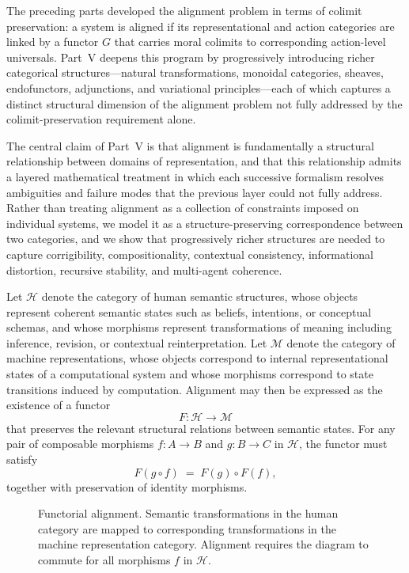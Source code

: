 \documentclass[12pt]{article}
\theoremstyle{definition}
\begin{document}
The preceding parts developed the alignment problem in terms of colimit
preservation: a system is aligned if its representational and action categories
are linked by a functor $G$ that carries moral colimits to corresponding
action-level universals. Part~V deepens this program by progressively
introducing richer categorical structures---natural transformations, monoidal
categories, sheaves, endofunctors, adjunctions, and variational principles---each
of which captures a distinct structural dimension of the alignment problem not
fully addressed by the colimit-preservation requirement alone.

The central claim of Part~V is that alignment is fundamentally a structural
relationship between domains of representation, and that this relationship admits
a layered mathematical treatment in which each successive formalism resolves
ambiguities and failure modes that the previous layer could not fully address.
Rather than treating alignment as a collection of constraints imposed on
individual systems, we model it as a structure-preserving correspondence between
two categories, and we show that progressively richer structures are needed to
capture corrigibility, compositionality, contextual consistency, informational
distortion, recursive stability, and multi-agent coherence.

Let $\mathcal{H}$ denote the category of human semantic structures, whose
objects represent coherent semantic states such as beliefs, intentions, or
conceptual schemas, and whose morphisms represent transformations of meaning
including inference, revision, or contextual reinterpretation. Let $\mathcal{M}$
denote the category of machine representations, whose objects correspond to
internal representational states of a computational system and whose morphisms
correspond to state transitions induced by computation. Alignment may then be
expressed as the existence of a functor
\begin{equation}
  F : \mathcal{H} \to \mathcal{M}
\end{equation}
that preserves the relevant structural relations between semantic states. For any
pair of composable morphisms $f : A \to B$ and $g : B \to C$ in $\mathcal{H}$,
the functor must satisfy
\begin{equation}
  F(g \circ f) \;=\; F(g) \circ F(f),
\end{equation}
together with preservation of identity morphisms.

\begin{figure}[h]
\centering
{}
\caption{Functorial alignment. Semantic transformations in the human category
are mapped to corresponding transformations in the machine representation
category. Alignment requires the diagram to commute for all morphisms $f$ in
$\mathcal{H}$.}
\end{figure}
\end{document}
